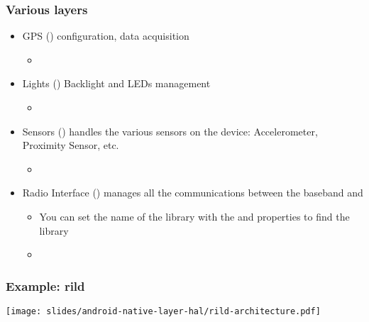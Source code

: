 \begin{frame}
  \frametitle{Various layers}
  \begin{itemize}
  \item GPS () configuration, data acquisition
    \begin{itemize}
    \item {}
    \end{itemize}
  \item Lights () Backlight and LEDs management
    \begin{itemize}
    \item {}
    \end{itemize}
  \item Sensors () handles the various sensors on
    the device: Accelerometer, Proximity Sensor, etc.
    \begin{itemize}
    \item {}
    \end{itemize}
  \item Radio Interface () manages all
    the communications between the baseband and 
    \begin{itemize}
    \item You can set the name of the library with the  and
       properties to find the library
    \item {}
    \end{itemize}
  \end{itemize}
\end{frame}

\begin{frame}
  \frametitle{Example: rild}
  \begin{center}
    \texttt{[image: slides/android-native-layer-hal/rild-architecture.pdf]}
  \end{center}
\end{frame}
